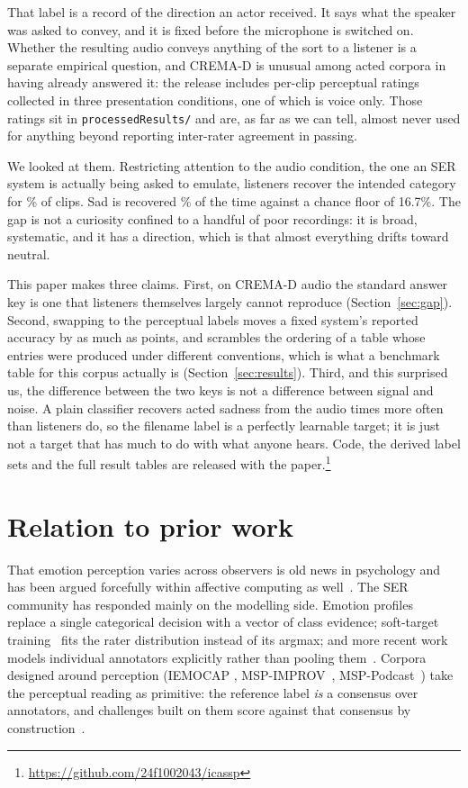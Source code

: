 \documentclass{article}
\begin{document}
That label is a record of the direction an actor received. It says what the
speaker was asked to convey, and it is fixed before the microphone is switched
on. Whether the resulting audio conveys anything of the sort to a listener is a
separate empirical question, and CREMA-D is unusual among acted corpora in
having already answered it: the release includes per-clip perceptual ratings
collected in three presentation conditions, one of which is voice only. Those
ratings sit in \texttt{processedResults/} and are, as far as we can tell, almost
never used for anything beyond reporting inter-rater agreement in passing.

We looked at them. Restricting attention to the audio condition, the one an SER
system is actually being asked to emulate, listeners recover the
intended category for \Recovery\% of clips. Sad is recovered \SadRecovery\% of
the time against a chance floor of 16.7\%. The gap is not a curiosity confined
to a handful of poor recordings: it is broad, systematic, and it has a
direction, which is that almost everything drifts toward neutral.

This paper makes three claims. First, on CREMA-D audio the standard answer key
is one that listeners themselves largely cannot reproduce
(Section~\ref{sec:gap}). Second, swapping to the perceptual labels moves a fixed
system's reported accuracy by as much as \SwingWAmax{} points, and scrambles the
ordering of a table whose entries were produced under different conventions,
which is what a benchmark table for this corpus actually is
(Section~\ref{sec:results}). Third, and this surprised us, the
difference between the two keys is not a difference between signal and noise. A
plain classifier recovers acted sadness from the audio \SadRatio{} times more
often than listeners do, so the filename label is a perfectly learnable target;
it is just not a target that has much to do with what anyone hears. Code, the
derived label sets and the full result tables are released with the
paper.\footnote{\url{https://github.com/24f1002043/icassp}}

\section{Relation to prior work}
\label{sec:prior}

That emotion perception varies across observers is old news in psychology
\cite{russell1994universality,scherer2003vocal} and has been argued forcefully
within affective computing as well~\cite{barrett2019emotional,
sethu2019ambiguous}. The SER community has responded mainly on the modelling
side. Emotion profiles~\cite{mower2011profiles} replace a single categorical
decision with a vector of class evidence; soft-target
training~\cite{ando2018soft} fits the rater distribution instead of its argmax;
and more recent work models individual annotators explicitly rather than pooling
them~\cite{tavernor2024annotators}. Corpora designed around perception (IEMOCAP
\cite{busso2008iemocap}, MSP-IMPROV~\cite{busso2017improv},
MSP-Podcast~\cite{lotfian2019podcast}) take the perceptual reading as
primitive: the reference label \emph{is} a consensus over annotators, and
challenges built on them score against that consensus by
construction~\cite{naini2025challenge}.
\end{document}
